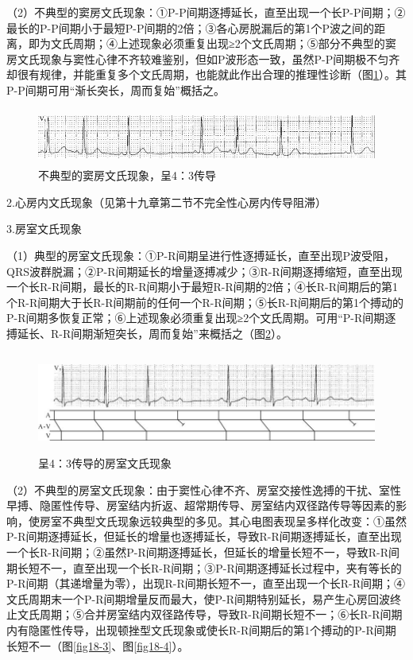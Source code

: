 （2）不典型的窦房文氏现象：①P-P间期逐搏延长，直至出现一个长P-P间期；②最长的P-P间期小于最短P-P间期的2倍；③各心房脱漏后的第1个P波之间的距离，即为文氏周期；④上述现象必须重复出现≥2个文氏周期；⑤部分不典型的窦房文氏现象与窦性心律不齐较难鉴别，但如P波形态一致，虽然P-P间期极不匀齐却很有规律，并能重复多个文氏周期，也能就此作出合理的推理性诊断（图\ref{fig18-1}）。其P-P间期可用“渐长突长，周而复始”概括之。

\begin{figure}[!htbp]
 \centering
 \includegraphics[width=5.58333in,height=0.71875in]{./images/Image00302.jpg}
 \captionsetup{justification=centering}
 \caption{不典型的窦房文氏现象，呈4：3传导}
 \label{fig18-1}
  \end{figure} 

2.心房内文氏现象（见第十九章第二节不完全性心房内传导阻滞）

3.房室文氏现象

（1）典型的房室文氏现象：①P-R间期呈进行性逐搏延长，直至出现P波受阻，QRS波群脱漏；②P-R间期延长的增量逐搏减少；③R-R间期逐搏缩短，直至出现一个长R-R间期，最长的R-R间期小于最短R-R间期的2倍；④长R-R间期后的第1个R-R间期大于长R-R间期前的任何一个R-R间期；⑤长R-R间期后的第1个搏动的P-R间期多恢复正常；⑥上述现象必须重复出现≥2个文氏周期。可用“P-R间期逐搏延长、R-R间期渐短突长，周而复始”来概括之（图\ref{fig18-2}）。

\begin{figure}[!htbp]
 \centering
 \includegraphics[width=5.80208in,height=1.30208in]{./images/Image00303.jpg}
 \captionsetup{justification=centering}
 \caption{呈4：3传导的房室文氏现象}
 \label{fig18-2}
  \end{figure} 

（2）不典型的房室文氏现象：由于窦性心律不齐、房室交接性逸搏的干扰、室性早搏、隐匿性传导、房室结内折返、超常期传导、房室结内双径路传导等因素的影响，使房室不典型文氏现象远较典型的多见。其心电图表现呈多样化改变：①虽然P-R间期逐搏延长，但延长的增量也逐搏延长，导致R-R间期逐搏延长，直至出现一个长R-R间期；②虽然P-R间期逐搏延长，但延长的增量长短不一，导致R-R间期长短不一，直至出现一个长R-R间期；③P-R间期逐搏延长过程中，夹有等长的P-R间期（其递增量为零），出现R-R间期长短不一，直至出现一个长R-R间期；④文氏周期末一个P-R间期增量反而最大，使P-R间期特别延长，易产生心房回波终止文氏周期；⑤合并房室结内双径路传导，导致R-R间期长短不一；⑥长R-R间期内有隐匿性传导，出现顿挫型文氏现象或使长R-R间期后的第1个搏动的P-R间期长短不一（图\ref{fig18-3}、图\ref{fig18-4}）。

